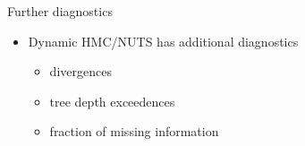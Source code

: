 \documentclass[finnish,english,t]{beamer}
\begin{document}
\begin{frame}
   
   {\Large\color{navyblue} Further diagnostics}

   \begin{itemize}
   \item Dynamic HMC/NUTS has additional diagnostics
     \begin{itemize}
     \item divergences
     \item tree depth exceedences
     \item fraction of missing information
     \end{itemize}
   \end{itemize}
   
 \end{frame}
\end{document}
